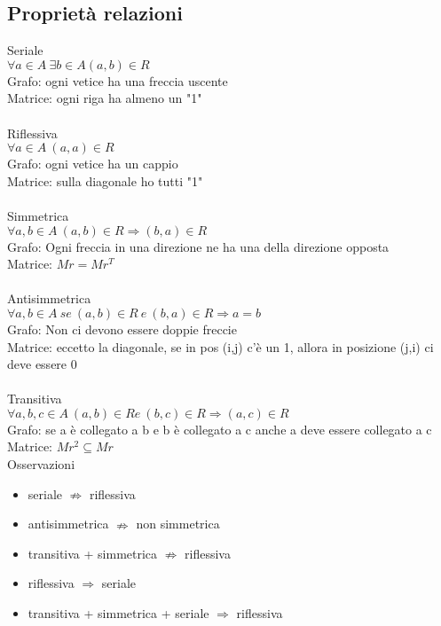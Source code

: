 \documentclass{article}
\begin{document}
		\allsectionsfont{\small}
		\scriptsize
		
		\begin{multicols*}{3}
		\section{Proprietà relazioni}
		
		{\large Seriale}\\
		\(\forall a \in A \  \exists b \in A (a,b) \in R\)\\
		Grafo: ogni vetice ha una freccia uscente\\
		Matrice: ogni riga ha almeno un "1"\\\\
		{\large Riflessiva}\\
		\(\forall a \in A \  (a,a) \in R\)\\
		Grafo: ogni vetice ha un cappio\\
		Matrice: sulla diagonale ho tutti "1"\\\\
		{\large Simmetrica}\\
		\(\forall a,b \in A \  (a,b) \in R \Rightarrow (b,a)\in R\)\\
		Grafo: Ogni freccia in una direzione ne ha una della direzione opposta\\
		Matrice: \(Mr=Mr^T\)\\\\
		{\large Antisimmetrica}\\
		\(\forall a,b \in A \  se\ (a,b) \in R \ e\  (b,a)\in R \Rightarrow a=b\)\\
		Grafo: Non ci devono essere doppie freccie\\
		Matrice: eccetto la diagonale, se in pos (i,j) c'è un 1, allora in posizione (j,i) ci deve essere 0\\\\
		{\large Transitiva}\\
		\(\forall a,b,c \in A \  (a,b) \in R e\ (b,c)\in R \Rightarrow (a,c)\in R\)\\
		Grafo: se a è collegato a b e b è collegato a c anche a deve essere collegato a c \\
		Matrice: \(Mr^2\subseteq Mr\)\\
		
		{\large Osservazioni}
		\begin{itemize}
			\setlength\itemsep{0.1mm}
			\item seriale \(\nRightarrow\) riflessiva
			\item antisimmetrica \(\nRightarrow\) non simmetrica
			\item transitiva + simmetrica \(\nRightarrow\) riflessiva
			\item riflessiva \(\Rightarrow\) seriale
			\item transitiva + simmetrica + seriale \(\Rightarrow\) riflessiva
		\end{itemize}
		

\end{multicols*}
\end{document}
